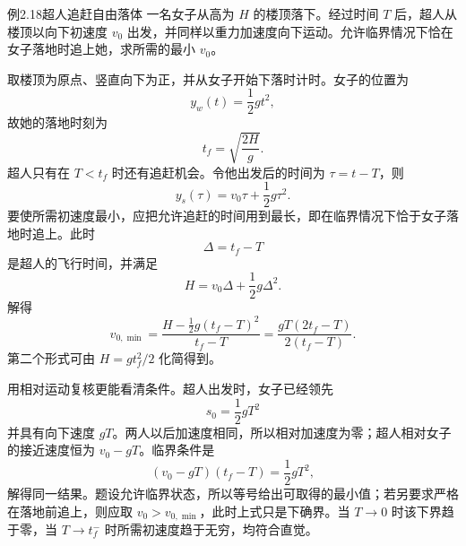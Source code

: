 \begin{origexamplebox}{例2.18\quad 超人追赶自由落体}
一名女子从高为 $H$ 的楼顶落下。经过时间 $T$ 后，超人从楼顶以向下初速度 $v_0$ 出发，并同样以重力加速度向下运动。允许临界情况下恰在女子落地时追上她，求所需的最小 $v_0$。
\end{origexamplebox}
\begin{xesolution}
取楼顶为原点、竖直向下为正，并从女子开始下落时计时。女子的位置为
\[
y_w(t)=\frac12gt^2,
\]
故她的落地时刻为
\[
t_f=\sqrt{\frac{2H}{g}}.
\]
超人只有在 $T<t_f$ 时还有追赶机会。令他出发后的时间为
$\tau=t-T$，则
\[
y_s(\tau)=v_0\tau+\frac12g\tau^2.
\]
要使所需初速度最小，应把允许追赶的时间用到最长，即在临界情况下恰于女子落地时追上。此时
\[
\Delta=t_f-T
\]
是超人的飞行时间，并满足
\[
H=v_0\Delta+\frac12g\Delta^2.
\]
解得
\[
\boxed{v_{0,\min}=\frac{H-\frac12g(t_f-T)^2}{t_f-T}
=\frac{gT(2t_f-T)}{2(t_f-T)}}.
\]
第二个形式可由 $H=gt_f^2/2$ 化简得到。

用相对运动复核更能看清条件。超人出发时，女子已经领先
\[
s_0=\frac12gT^2
\]
并具有向下速度 $gT$。两人以后加速度相同，所以相对加速度为零；超人相对女子的接近速度恒为 $v_0-gT$。临界条件是
\[
(v_0-gT)(t_f-T)=\frac12gT^2,
\]
解得同一结果。题设允许临界状态，所以等号给出可取得的最小值；若另要求严格在落地前追上，则应取 $v_0>v_{0,\min}$，此时上式只是下确界。当 $T\to0$ 时该下界趋于零，当 $T\to t_f^-$ 时所需初速度趋于无穷，均符合直觉。
\end{xesolution}

